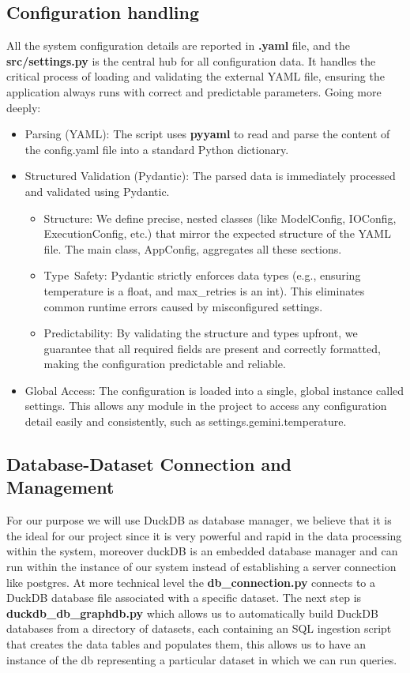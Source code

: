 \documentclass[12pt,a4paper]{article}
\begin{document}
\subsection{Configuration handling}
All the system configuration details are reported  in \textbf{.yaml} file, and the \textbf{src/settings.py} is the central hub for all configuration data. It handles the critical process of loading and validating the external YAML file, ensuring the application always runs with correct and predictable parameters.
Going more deeply:
\begin{itemize}
  \item Parsing (YAML): The script uses \textbf{pyyaml} to read and parse the content of the config.yaml file into a standard Python dictionary.
  \item Structured Validation (Pydantic): The parsed data is immediately processed and validated using Pydantic.
    \begin{itemize}
      \item   Structure: We define precise, nested classes (like ModelConfig, IOConfig, ExecutionConfig, etc.) that mirror the expected structure of the YAML file. The main class, AppConfig, aggregates all these sections.
      \item Type\ Safety: Pydantic strictly enforces data types (e.g., ensuring temperature is a float, and max\_retries is an int). This eliminates common runtime errors caused by misconfigured settings.
      \item Predictability: By validating the structure and types upfront, we guarantee that all required fields are present and correctly formatted, making the configuration predictable and reliable.
    \end{itemize}  
  \item Global Access: The configuration is loaded into a single, global instance called settings. This allows any module in the project to access any configuration detail easily and consistently, such as settings.gemini.temperature.
\end{itemize}

\subsection{Database-Dataset Connection and Management}
For our purpose we will use DuckDB as database manager, we believe that it is the ideal for our project since it is very powerful and rapid in the data processing within the system, moreover duckDB is an embedded database manager and can run within the instance of our system instead of establishing a server connection like postgres.
At more technical level the \textbf{db\_connection.py} connects to a DuckDB database file associated with a specific dataset.
The next step is \textbf{duckdb\_db\_graphdb.py} which allows us to automatically build DuckDB databases from a directory of datasets, each containing an SQL ingestion script that creates the data tables and populates them,  this allows us to have an instance of the db representing a particular dataset  in which we can run queries.
\end{document}
